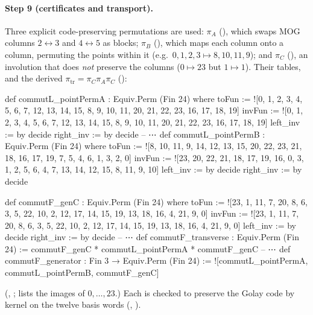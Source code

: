 \paragraph{Step 9 (certificates and transport).}  Three explicit code-preserving permutations are used: $\pi_A$
(), which swaps MOG columns $2\leftrightarrow3$ and $4\leftrightarrow5$ as blocks; $\pi_B$
(), which maps each column onto a column, permuting the points within it (e.g.\ $0,1,2,3\mapsto8,10,11,9$);
and $\pi_C$ (), an involution that does \emph{not} preserve the columns ($0\mapsto23$ but $1\mapsto1$).  Their
tables, and the derived $\pi_{\mathrm{tr}}=\pi_C\pi_A\pi_C$ ():
\begin{leancode}
def commutL_pointPermA : Equiv.Perm (Fin 24) where
  toFun := ![0, 1, 2, 3, 4, 5, 6, 7, 12, 13, 14, 15,
    8, 9, 10, 11, 20, 21, 22, 23, 16, 17, 18, 19]
  invFun := ![0, 1, 2, 3, 4, 5, 6, 7, 12, 13, 14, 15,
    8, 9, 10, 11, 20, 21, 22, 23, 16, 17, 18, 19]
  left_inv := by decide
  right_inv := by decide
-- ⋯
def commutL_pointPermB : Equiv.Perm (Fin 24) where
  toFun := ![8, 10, 11, 9, 14, 12, 13, 15, 20, 22, 23, 21,
    18, 16, 17, 19, 7, 5, 4, 6, 1, 3, 2, 0]
  invFun := ![23, 20, 22, 21, 18, 17, 19, 16, 0, 3, 1, 2,
    5, 6, 4, 7, 13, 14, 12, 15, 8, 11, 9, 10]
  left_inv := by decide
  right_inv := by decide
\end{leancode}
\begin{leancode}
def commutF_genC : Equiv.Perm (Fin 24) where
  toFun := ![23, 1, 11, 7, 20, 8, 6, 3, 5, 22, 10, 2,
    12, 17, 14, 15, 19, 13, 18, 16, 4, 21, 9, 0]
  invFun := ![23, 1, 11, 7, 20, 8, 6, 3, 5, 22, 10, 2,
    12, 17, 14, 15, 19, 13, 18, 16, 4, 21, 9, 0]
  left_inv := by decide
  right_inv := by decide
-- ⋯
def commutF_transverse : Equiv.Perm (Fin 24) :=
  commutF_genC * commutL_pointPermA * commutF_genC
-- ⋯
def commutF_generator : Fin 3 → Equiv.Perm (Fin 24) :=
  ![commutL_pointPermA, commutL_pointPermB, commutF_genC]
\end{leancode}
(, ; \lean{![…]} lists the
images of $0,\dots,23$.)  Each is checked to preserve the Golay code by kernel  on the twelve basis words
(, ).
